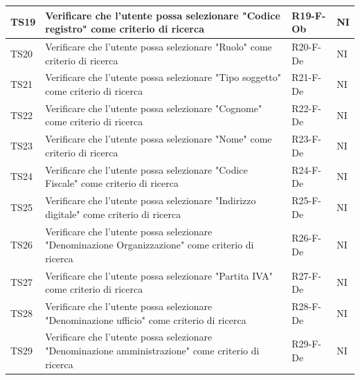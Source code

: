 \documentclass[a4paper,12pt]{article}
\begin{document}
\begin{longtable}{|M{1.2cm}|M{6.3cm}|M{2.5cm}|M{1.5cm}|}
                TS19 & Verificare che l'utente possa selezionare "Codice registro" come criterio di ricerca & R19-F-Ob & NI \\
                \hline
                
                TS20 & Verificare che l'utente possa selezionare "Ruolo" come criterio di ricerca & R20-F-De & NI \\
                \hline
                
                TS21 & Verificare che l'utente possa selezionare "Tipo soggetto" come criterio di ricerca & R21-F-De & NI \\
                \hline
                
                TS22 & Verificare che l'utente possa selezionare "Cognome" come criterio di ricerca & R22-F-De & NI \\
                \hline
                
                TS23 & Verificare che l'utente possa selezionare "Nome" come criterio di ricerca & R23-F-De & NI \\
                \hline
                
                TS24 & Verificare che l'utente possa selezionare "Codice Fiscale" come criterio di ricerca & R24-F-De & NI \\
                \hline
                
                TS25 & Verificare che l'utente possa selezionare "Indirizzo digitale" come criterio di ricerca & R25-F-De & NI \\
                \hline
                
                TS26 & Verificare che l'utente possa selezionare "Denominazione Organizzazione" come criterio di ricerca & R26-F-De & NI \\
                \hline
                
                TS27 & Verificare che l'utente possa selezionare "Partita IVA" come criterio di ricerca & R27-F-De & NI \\
                \hline

                TS28 & Verificare che l'utente possa selezionare "Denominazione ufficio" come criterio di ricerca & R28-F-De & NI \\
                \hline
                
                TS29 & Verificare che l'utente possa selezionare "Denominazione amministrazione" come criterio di ricerca & R29-F-De & NI \\
                \hline


\end{longtable}
\end{document}
